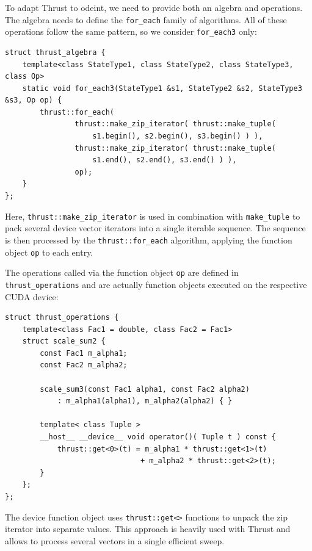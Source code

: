 \documentclass[final]{siamltex}
\newcommand{\code}[1]{\lstinline$#1$}
\begin{document}
To adapt Thrust to odeint, we need to provide both an algebra and
operations. The algebra needs to define the \code{for_each} family of
algorithms. All of these operations follow the same pattern,
so we consider \code{for_each3} only:
\begin{lstlisting}
struct thrust_algebra {
    template<class StateType1, class StateType2, class StateType3, class Op>
    static void for_each3(StateType1 &s1, StateType2 &s2, StateType3 &s3, Op op) {
        thrust::for_each(
                thrust::make_zip_iterator( thrust::make_tuple(
                    s1.begin(), s2.begin(), s3.begin() ) ),
                thrust::make_zip_iterator( thrust::make_tuple(
                    s1.end(), s2.end(), s3.end() ) ),
                op);
    }
};
\end{lstlisting}
Here, \code{thrust::make_zip_iterator} is used in combination with
\code{make_tuple} to pack several device vector iterators into a single
iterable sequence.  The sequence is then processed by the
\code{thrust::for_each} algorithm, applying the function object \code{op} to
each entry.

The operations called via the function object \code{op} are defined in
\code{thrust_operations} and are actually function objects executed on the
respective CUDA device:
\begin{lstlisting}
struct thrust_operations {
    template<class Fac1 = double, class Fac2 = Fac1>
    struct scale_sum2 {
        const Fac1 m_alpha1;
        const Fac2 m_alpha2;

        scale_sum3(const Fac1 alpha1, const Fac2 alpha2)
            : m_alpha1(alpha1), m_alpha2(alpha2) { }

        template< class Tuple >
        __host__ __device__ void operator()( Tuple t ) const {
            thrust::get<0>(t) = m_alpha1 * thrust::get<1>(t)
                               + m_alpha2 * thrust::get<2>(t);
        }
    };
};
\end{lstlisting}
The device function object uses \code{thrust::get<>} functions to unpack the
zip iterator into separate values.  This approach is heavily used with Thrust
and allows to process several vectors in a single efficient sweep.
\end{document}
